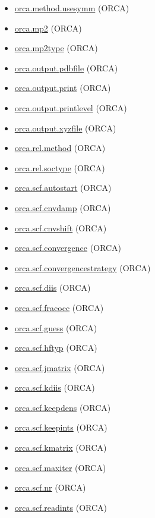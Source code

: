 \documentclass[11pt]{article}
\begin{document}
\begin{itemize}
\item \hyperref[kw:orca-method-usesymm]{orca.method.usesymm} (ORCA)
\item \hyperref[kw:orca-mp2]{orca.mp2} (ORCA)
\item \hyperref[kw:orca-mp2type]{orca.mp2type} (ORCA)
\item \hyperref[kw:orca-output-pdbfile]{orca.output.pdbfile} (ORCA)
\item \hyperref[kw:orca-output-print]{orca.output.print} (ORCA)
\item \hyperref[kw:orca-output-printlevel]{orca.output.printlevel} (ORCA)
\item \hyperref[kw:orca-output-xyzfile]{orca.output.xyzfile} (ORCA)
\item \hyperref[kw:orca-rel-method]{orca.rel.method} (ORCA)
\item \hyperref[kw:orca-rel-soctype]{orca.rel.soctype} (ORCA)
\item \hyperref[kw:orca-scf-autostart]{orca.scf.autostart} (ORCA)
\item \hyperref[kw:orca-scf-cnvdamp]{orca.scf.cnvdamp} (ORCA)
\item \hyperref[kw:orca-scf-cnvshift]{orca.scf.cnvshift} (ORCA)
\item \hyperref[kw:orca-scf-convergence]{orca.scf.convergence} (ORCA)
\item \hyperref[kw:orca-scf-convergencestrategy]{orca.scf.convergencestrategy} (ORCA)
\item \hyperref[kw:orca-scf-diis]{orca.scf.diis} (ORCA)
\item \hyperref[kw:orca-scf-fracocc]{orca.scf.fracocc} (ORCA)
\item \hyperref[kw:orca-scf-guess]{orca.scf.guess} (ORCA)
\item \hyperref[kw:orca-scf-hftyp]{orca.scf.hftyp} (ORCA)
\item \hyperref[kw:orca-scf-jmatrix]{orca.scf.jmatrix} (ORCA)
\item \hyperref[kw:orca-scf-kdiis]{orca.scf.kdiis} (ORCA)
\item \hyperref[kw:orca-scf-keepdens]{orca.scf.keepdens} (ORCA)
\item \hyperref[kw:orca-scf-keepints]{orca.scf.keepints} (ORCA)
\item \hyperref[kw:orca-scf-kmatrix]{orca.scf.kmatrix} (ORCA)
\item \hyperref[kw:orca-scf-maxiter]{orca.scf.maxiter} (ORCA)
\item \hyperref[kw:orca-scf-nr]{orca.scf.nr} (ORCA)
\item \hyperref[kw:orca-scf-readints]{orca.scf.readints} (ORCA)

\end{itemize}
\end{document}
